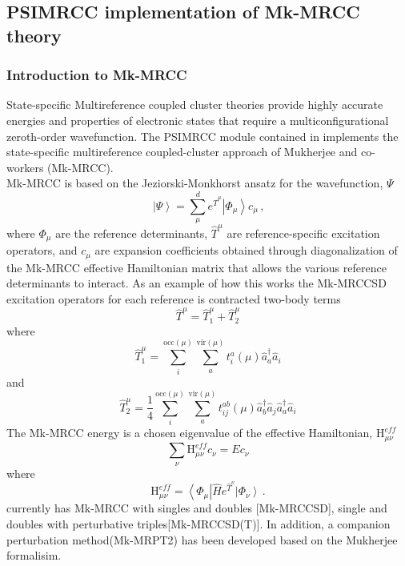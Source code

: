 \subsection{PSIMRCC implementation of Mk-MRCC theory} \label{sec:psimrcc}
\renewcommand{\optionname}[2]{\texttt{\nameref{op-#2-#1}}}

\subsubsection{Introduction to Mk-MRCC}
State-specific Multireference coupled cluster theories provide highly accurate energies and properties of electronic states that require a multiconfigurational zeroth-order wavefunction.  The PSIMRCC module contained in \PSIfour implements the state-specific multireference coupled-cluster approach of Mukherjee and co-workers (Mk-MRCC).  
\\
Mk-MRCC is based on the Jeziorski-Monkhorst ansatz for the wavefunction, $\Psi$
\begin{equation*}
\left| \Psi \right \rangle = \sum_\mu^d e^{\hat{T}^\mu} \left| \Phi_\mu \right\rangle c_\mu \, \text{,}
\end{equation*}
where $\Phi_\mu$ are the reference determinants, $\hat{T}^\mu$ are reference-specific excitation operators, and $c_\mu$ are expansion coefficients obtained through diagonalization of the Mk-MRCC effective Hamiltonian matrix that allows the various reference determinants to interact. As an example of how this works the Mk-MRCCSD excitation operators for each reference is contracted two-body terms
\begin{equation*}
\hat{T}^\mu = \hat{T}^\mu_1 + \hat{T}^\mu_2
\end{equation*} 
where
\begin{equation*}
\hat{T}^\mu_1 = \sum_i^{\textrm{occ}(\mu)} \sum_a^{\textrm{vir}(\mu)} t_i^a (\mu) \hat{a}^\dagger_a \hat{a}_i
\end{equation*}
and
\begin{equation*}
\hat{T}^\mu_2 =\frac{1}{4} \sum_i^{\textrm{occ}(\mu)} \sum_a^{\textrm{vir}(\mu)} t_{ij}^{ab} (\mu) \hat{a}^\dagger_b \hat{a}_j \hat{a}^\dagger_a \hat{a}_i  
\end{equation*}
The Mk-MRCC energy is a chosen eigenvalue of the effective Hamiltonian, $\textrm{H}^{eff}_{\mu \nu}$
 \begin{equation*}
\sum_\nu \textrm{H}^{eff}_{\mu \nu} c_\nu =E c_\nu
 \end{equation*}
where 
\begin{equation*}
\textrm{H}^{eff}_{\mu \nu} = \left \langle \Phi_\mu \right | \hat{H}e^{\hat{T}^\nu} \left | \Phi_\nu \right \rangle \, \textrm{.}
\end{equation*}
 \PSIfour currently has Mk-MRCC with singles and doubles [Mk-MRCCSD], single and doubles with perturbative triples[Mk-MRCCSD(T)]. In addition, a companion perturbation method(Mk-MRPT2) has been developed based on the Mukherjee formalisim. 
\\

